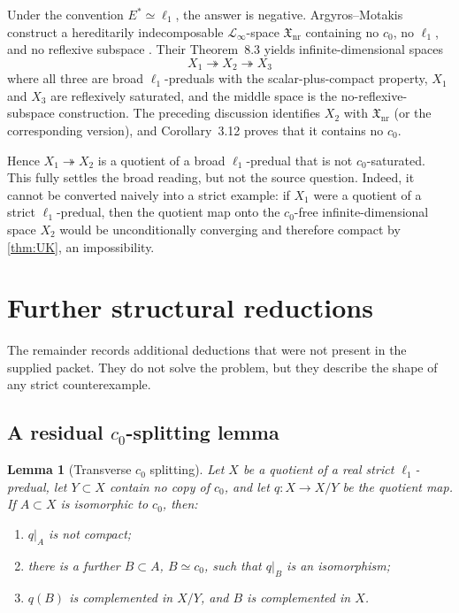 \documentclass[11pt]{article}
\newtheorem{lemma}[theorem]{Lemma}
\theoremstyle{definition}
\newcommand{\onto}{\twoheadrightarrow}
\newcommand{\isom}{\simeq}
\begin{document}
Under the convention $E^*\isom\ell_1$, the answer is negative.
Argyros--Motakis construct a hereditarily indecomposable
$\mathcal L_\infty$-space $\mathfrak X_{\mathrm{nr}}$ containing no $c_0$, no
$\ell_1$, and no reflexive subspace \cite{ArgyrosMotakis2016}.  Their
Theorem~8.3 yields infinite-dimensional spaces
\[
    X_1\onto X_2\onto X_3
\]
where all three are broad $\ell_1$-preduals with the scalar-plus-compact
property, $X_1$ and $X_3$ are reflexively saturated, and the middle space is
the no-reflexive-subspace construction.  The preceding discussion identifies
$X_2$ with $\mathfrak X_{\mathrm{nr}}$ (or the corresponding version), and
Corollary~3.12 proves that it contains no $c_0$.

Hence $X_1\onto X_2$ is a quotient of a broad $\ell_1$-predual that is not
$c_0$-saturated.  This fully settles the broad reading, but not the source
question.  Indeed, it cannot be converted naively into a strict example: if
$X_1$ were a quotient of a strict $\ell_1$-predual, then the quotient map onto
the $c_0$-free infinite-dimensional space $X_2$ would be unconditionally
converging and therefore compact by \cref{thm:UK}, an impossibility.

\section{Further structural reductions}

The remainder records additional deductions that were not present in the
supplied packet.  They do not solve the problem, but they describe the shape
of any strict counterexample.

\subsection{A residual $c_0$-splitting lemma}

\begin{lemma}[Transverse $c_0$ splitting]\label{lem:transverse}
Let $X$ be a quotient of a real strict $\ell_1$-predual, let
$Y\subset X$ contain no copy of $c_0$, and let $q:X\to X/Y$ be the quotient
map.  If $A\subset X$ is isomorphic to $c_0$, then:
\begin{enumerate}
\item $q|_A$ is not compact;
\item there is a further $B\subset A$, $B\isom c_0$, such that $q|_B$ is an
      isomorphism;
\item $q(B)$ is complemented in $X/Y$, and $B$ is complemented in $X$.
\end{enumerate}
\end{lemma}
\end{document}
